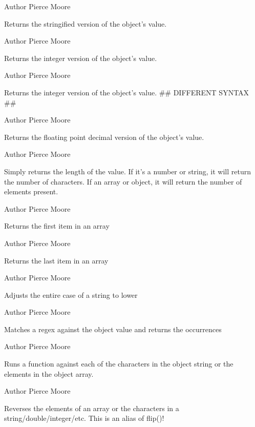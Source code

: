 \begin{DoxyAuthor}{Author}
Pierce Moore
\end{DoxyAuthor}
Returns the stringified version of the object's value.

\begin{DoxyAuthor}{Author}
Pierce Moore
\end{DoxyAuthor}
Returns the integer version of the object's value.

\begin{DoxyAuthor}{Author}
Pierce Moore
\end{DoxyAuthor}
Returns the integer version of the object's value. \#\# D\-I\-F\-F\-E\-R\-E\-N\-T S\-Y\-N\-T\-A\-X \#\#

\begin{DoxyAuthor}{Author}
Pierce Moore
\end{DoxyAuthor}
Returns the floating point decimal version of the object's value.

\begin{DoxyAuthor}{Author}
Pierce Moore
\end{DoxyAuthor}
Simply returns the length of the value. If it's a number or string, it will return the number of characters. If an array or object, it will return the number of elements present.

\begin{DoxyAuthor}{Author}
Pierce Moore
\end{DoxyAuthor}
Returns the first item in an array

\begin{DoxyAuthor}{Author}
Pierce Moore
\end{DoxyAuthor}
Returns the last item in an array

\begin{DoxyAuthor}{Author}
Pierce Moore
\end{DoxyAuthor}
Adjusts the entire case of a string to lower

\begin{DoxyAuthor}{Author}
Pierce Moore
\end{DoxyAuthor}
Matches a regex against the object value and returns the occurrences

\begin{DoxyAuthor}{Author}
Pierce Moore
\end{DoxyAuthor}
Runs a function against each of the characters in the object string or the elements in the object array.

\begin{DoxyAuthor}{Author}
Pierce Moore
\end{DoxyAuthor}
Reverses the elements of an array or the characters in a string/double/integer/etc. This is an alias of flip()!

